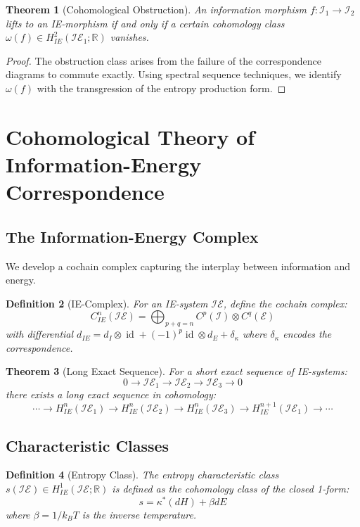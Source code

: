 \documentclass[12pt]{article}
\newtheorem{theorem}{Theorem}[section]
\newtheorem{definition}[theorem]{Definition}
\DeclareMathOperator{\id}{id}
\begin{document}
\begin{theorem}[Cohomological Obstruction]
An information morphism $f: \mathcal{I}_1 \to \mathcal{I}_2$ lifts to an IE-morphism if and only if a certain cohomology class $\omega(f) \in H^2_{IE}(\mathcal{IE}_1; \mathbb{R})$ vanishes.
\end{theorem}

\begin{proof}
The obstruction class arises from the failure of the correspondence diagrams to commute exactly. Using spectral sequence techniques, we identify $\omega(f)$ with the transgression of the entropy production form.
\end{proof}

\section{Cohomological Theory of Information-Energy Correspondence}

\subsection{The Information-Energy Complex}

We develop a cochain complex capturing the interplay between information and energy.

\begin{definition}[IE-Complex]
For an IE-system $\mathcal{IE}$, define the cochain complex:
\[C^n_{IE}(\mathcal{IE}) = \bigoplus_{p+q=n} C^p(\mathcal{I}) \otimes C^q(\mathcal{E})\]
with differential $d_{IE} = d_I \otimes \id + (-1)^p \id \otimes d_E + \delta_\kappa$
where $\delta_\kappa$ encodes the correspondence.
\end{definition}

\begin{theorem}[Long Exact Sequence]
For a short exact sequence of IE-systems:
\[0 \to \mathcal{IE}_1 \to \mathcal{IE}_2 \to \mathcal{IE}_3 \to 0\]
there exists a long exact sequence in cohomology:
\[\cdots \to H^n_{IE}(\mathcal{IE}_1) \to H^n_{IE}(\mathcal{IE}_2) \to H^n_{IE}(\mathcal{IE}_3) \to H^{n+1}_{IE}(\mathcal{IE}_1) \to \cdots\]
\end{theorem}

\subsection{Characteristic Classes}

\begin{definition}[Entropy Class]
The entropy characteristic class $s(\mathcal{IE}) \in H^1_{IE}(\mathcal{IE}; \mathbb{R})$ is defined as the cohomology class of the closed 1-form:
\[s = \kappa^*(dH) + \beta dE\]
where $\beta = 1/k_B T$ is the inverse temperature.
\end{definition}
\end{document}
